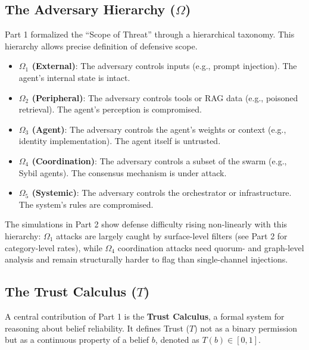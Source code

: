 \documentclass[
]{article}
\providecommand{\tightlist}{%
  \setlength{\itemsep}{0pt}\setlength{\parskip}{0pt}}
\begin{document}
\subsection{\texorpdfstring{The Adversary Hierarchy
(\(\Omega\))}{The Adversary Hierarchy (Omega)}}\label{sec:adversary-hierarchy}

Part 1 formalized the ``Scope of Threat'' through a hierarchical
taxonomy. This hierarchy allows precise definition of defensive scope.

\begin{itemize}
\tightlist
\item
  \textbf{\(\Omega_1\) (External)}: The adversary controls inputs (e.g.,
  prompt injection). The agent's internal state is intact.
\item
  \textbf{\(\Omega_2\) (Peripheral)}: The adversary controls tools or
  RAG data (e.g., poisoned retrieval). The agent's perception is
  compromised.
\item
  \textbf{\(\Omega_3\) (Agent)}: The adversary controls the agent's
  weights or context (e.g., identity implementation). The agent itself
  is untrusted.
\item
  \textbf{\(\Omega_4\) (Coordination)}: The adversary controls a subset
  of the swarm (e.g., Sybil agents). The consensus mechanism is under
  attack.
\item
  \textbf{\(\Omega_5\) (Systemic)}: The adversary controls the
  orchestrator or infrastructure. The system's rules are compromised.
\end{itemize}

The simulations in Part 2 show defense difficulty rising non-linearly
with this hierarchy: \(\Omega_1\) attacks are largely caught by
surface-level filters (see Part 2 for category-level rates), while
\(\Omega_4\) coordination attacks need quorum- and graph-level analysis
and remain structurally harder to flag than single-channel injections.

\subsection{\texorpdfstring{The Trust Calculus
(\(T\))}{The Trust Calculus (T)}}\label{sec:trust-calculus-review}

A central contribution of Part 1 is the \textbf{Trust Calculus}, a
formal system for reasoning about belief reliability. It defines Trust
(\(T\)) not as a binary permission but as a continuous property of a
belief \(b\), denoted as \(T(b) \in [0, 1]\).
\end{document}
